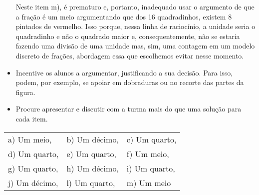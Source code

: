 \begin{atividade}
\begin{itemize}
Neste item m), é prematuro e, portanto, inadequado usar o argumento de que a fração é um meio argumentando que dos 16 quadradinhos, existem 8 pintados de vermelho. Isso porque, nessa linha de raciocínio, a unidade seria o quadradinho e não o quadrado maior e, consequentemente, não se estaria fazendo uma divisão de uma unidade mas, sim, uma contagem em um modelo discreto de frações, abordagem essa que escolhemos evitar nesse momento.   


\item Incentive os alunos a argumentar, justificando a sua decisão. Para isso, podem, por exemplo, se apoiar em dobraduras ou no recorte das partes da figura.
\item Procure apresentar e discutir com a turma mais do que uma solução para cada item.
\end{itemize} %

\solucao
  \begin{tabular}{lll}
a) Um meio,&  b) Um décimo,& c) Um quarto,\\
d) Um quarto,& e) Um quarto,& f) Um meio,\\
g) Um quarto,& h) Um décimo,& i) Um quarto,\\
j) Um décimo,& l) Um quarto,& m) Um meio
\end{tabular}


\end{atividade}